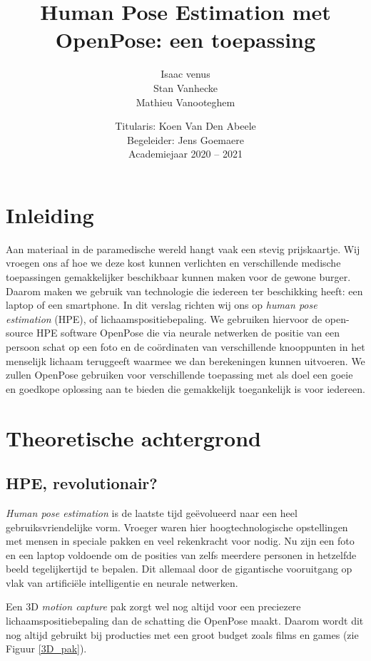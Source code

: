 \documentclass[a4paper,twoside,kulak]{kulakreport}
\title{Human Pose Estimation met OpenPose: een toepassing}
\subtitle{}
\author{Isaac venus\\Stan Vanhecke\\Mathieu Vanooteghem}
\institute{KU Leuven Kulak, Wetenschap \& Technologie}
\date{Titularis: Koen Van Den Abeele\\Begeleider: Jens Goemaere\\Academiejaar 2020 -- 2021}
\begin{document}

\titlepage

\tableofcontents

\chapter*{Inleiding}
Aan materiaal in de paramedische wereld hangt vaak een stevig prijskaartje. Wij vroegen ons af hoe we deze kost kunnen verlichten en verschillende medische toepassingen gemakkelijker beschikbaar kunnen maken voor de gewone burger. Daarom maken we gebruik van technologie die iedereen ter beschikking heeft: een laptop of een smartphone.
In dit verslag richten wij ons op \emph{human pose estimation} (HPE), of lichaamspositiebepaling. We gebruiken hiervoor de open-source HPE software OpenPose die via neurale netwerken de positie van een persoon schat op een foto en de coördinaten van verschillende knooppunten in het menselijk lichaam teruggeeft waarmee we dan berekeningen kunnen uitvoeren. We zullen OpenPose gebruiken voor verschillende toepassing met als doel een goeie en goedkope oplossing aan te bieden die gemakkelijk toegankelijk is voor iedereen.

\chapter{Theoretische achtergrond}
\section{HPE, revolutionair?}
\emph{Human pose estimation} is de laatste tijd geëvolueerd naar een heel gebruiksvriendelijke vorm. Vroeger waren hier hoogtechnologische opstellingen met mensen in speciale pakken en veel rekenkracht voor nodig. Nu zijn een foto en een laptop voldoende om de posities van zelfs meerdere personen in hetzelfde beeld tegelijkertijd te bepalen. Dit allemaal door de gigantische vooruitgang op vlak van artificiële intelligentie en neurale netwerken.

Een 3D \emph{motion capture} pak zorgt wel nog altijd voor een preciezere lichaamspositiebepaling dan de schatting die OpenPose maakt. Daarom wordt dit nog altijd gebruikt bij producties met een groot budget zoals films en games (zie Figuur \ref{3D_pak}).
\end{document}

